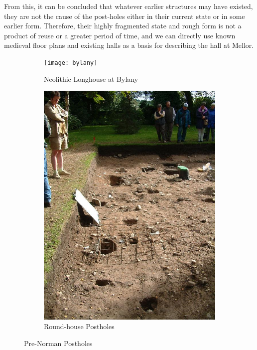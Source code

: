 \documentclass[letterpaper,11pt,titlepage]{article}
\begin{document}
{From this, it can be concluded that whatever earlier structures may have existed, they are not the cause of the post-holes either in their current state or in some earlier form. Therefore, their highly fragmented state and rough form is not a product of reuse or a greater period of time, and we can directly use known medieval floor plans and existing halls as a basis for describing the hall at Mellor.

\begin{figure}
	\centering
	\begin{subfigure}[b]{0.3\textwidth}
		\texttt{[image: bylany]}
		\caption{Neolithic Longhouse at Bylany}
		\label{fig:bylany}
	\end{subfigure}
	\begin{subfigure}[b]{0.3\textwidth}
		\includegraphics[width=\textwidth]{DSCF1510}
		\caption{Round-house Postholes}
		\label{fig:roundhouse}
	\end{subfigure}
	\caption{Pre-Norman Postholes}\label{fig:prenorman}
\end{figure}


}
\end{document}
